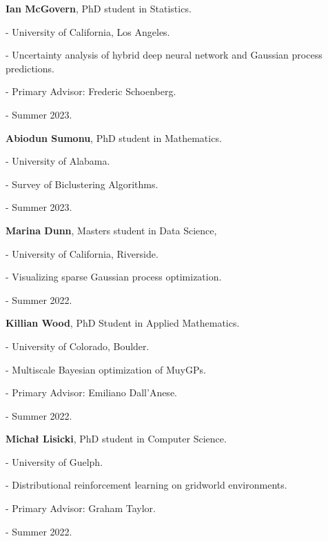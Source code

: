 \begin{innerlist}
  \item[] \textbf{Ian McGovern},
  PhD student in Statistics.
  \begin{innerlist}
    \item[-] University of California, Los Angeles.
    \item[-] Uncertainty analysis of hybrid deep neural network and Gaussian process predictions.
    \item[-] Primary Advisor: Frederic Schoenberg.
    \item[-] Summer 2023.
  \end{innerlist}

  \item[] \textbf{Abiodun Sumonu},
  PhD student in Mathematics.
  \begin{innerlist}
    \item[-] University of Alabama.
    \item[-] Survey of Biclustering Algorithms.
    \item[-] Summer 2023.
  \end{innerlist}

  \item[] \textbf{Marina Dunn},
  Masters student in Data Science,
  \begin{innerlist}
    \item[-] University of California, Riverside.
    \item[-] Visualizing sparse Gaussian process optimization.
    \item[-] Summer 2022.
  \end{innerlist}

  \item[] \textbf{Killian Wood},
  PhD Student in Applied Mathematics.
  \begin{innerlist}
    \item[-] University of Colorado, Boulder.
    \item[-] Multiscale Bayesian optimization of MuyGPs.
    \item[-] Primary Advisor: Emiliano Dall'Anese.
    \item[-] Summer 2022.
  \end{innerlist}

  \item[] \textbf{Micha{\l}
    Lisicki},
  PhD student in Computer Science.
  \begin{innerlist}
    \item[-] University of Guelph.
    \item[-] Distributional reinforcement learning on gridworld environments.
    \item[-] Primary Advisor: Graham Taylor.
    \item[-] Summer 2022.
  \end{innerlist}


\end{innerlist}
